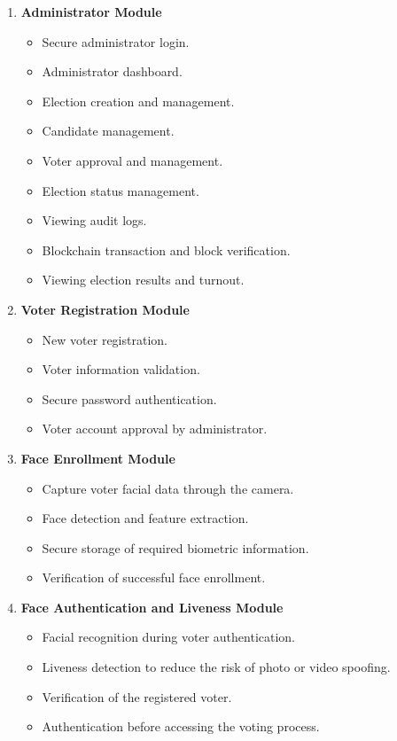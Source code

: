 \documentclass[12pt,a4paper]{report}
\begin{document}
\begin{enumerate}[leftmargin=*, itemsep=4pt]
	
	\item \textbf{Administrator Module}
	\begin{itemize}
		\item Secure administrator login.
		\item Administrator dashboard.
		\item Election creation and management.
		\item Candidate management.
		\item Voter approval and management.
		\item Election status management.
		\item Viewing audit logs.
		\item Blockchain transaction and block verification.
		\item Viewing election results and turnout.
	\end{itemize}
	
	\item \textbf{Voter Registration Module}
	\begin{itemize}
		\item New voter registration.
		\item Voter information validation.
		\item Secure password authentication.
		\item Voter account approval by administrator.
	\end{itemize}
	
	\item \textbf{Face Enrollment Module}
	\begin{itemize}
		\item Capture voter facial data through the camera.
		\item Face detection and feature extraction.
		\item Secure storage of required biometric information.
		\item Verification of successful face enrollment.
	\end{itemize}
	\newpage	
	\item \textbf{Face Authentication and Liveness Module}
	\begin{itemize}
		\item Facial recognition during voter authentication.
		\item Liveness detection to reduce the risk of photo or video spoofing.
		\item Verification of the registered voter.
		\item Authentication before accessing the voting process.
	\end{itemize}
	

\end{enumerate}
\end{document}
